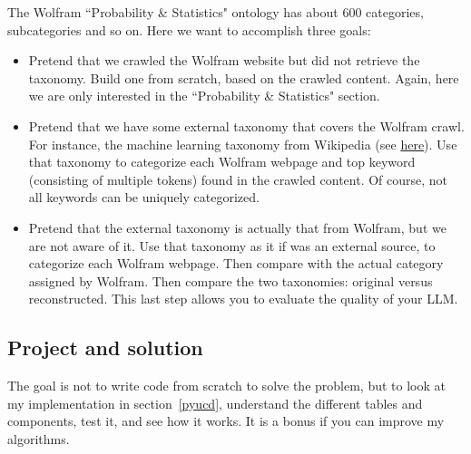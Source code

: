 \documentclass[oneside,10pt]{book}
\begin{document}
\noindent The Wolfram ``Probability \& Statistics" ontology has about 600 categories, subcategories and so on. Here we want to accomplish three goals:
\vspace{1ex}
\begin{itemize}
\item Pretend that we crawled the Wolfram website but did not retrieve the taxonomy. Build one from scratch, based on the crawled content.
Again, here we are only interested in the ``Probability \& Statistics" section. 
\item Pretend that we have some external taxonomy that covers the Wolfram crawl. For instance, the 
machine learning taxonomy from Wikipedia (see \href{https://en.wikipedia.org/wiki/Category:Machine_learning}{here}). Use that taxonomy to categorize each 
 Wolfram webpage and top keyword (consisting of multiple tokens) found in the crawled content. Of course, not all keywords can be uniquely categorized. 
\item Pretend that the external taxonomy is actually that from Wolfram, but we are not aware of it. Use that taxonomy as it if was an external source, to categorize 
 each Wolfram webpage. Then compare with the actual category assigned by Wolfram.  Then compare the two taxonomies: original versus reconstructed. 
This last step allows you to evaluate the quality of your LLM. 
\end{itemize}

\subsection{Project and solution}


The goal is not to write code from scratch to solve the problem, but to look at my implementation in section~\ref{pyucd}, understand the different tables and components,
 test it, and see how it works. It is a bonus if you can improve my algorithms. 
\end{document}
